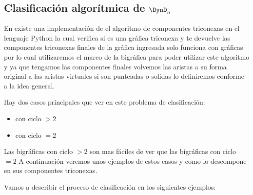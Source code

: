 \subsection{Clasificación algorítmica de $\DynD_{n}$}
En \citep{TricLinTimAlg} existe una implementación de el algoritmo de componentes triconexas en el lenguaje Python la cual verifica si es una gráfica triconexa y te devuelve las componentes triconexas finales de la gráfica ingresada solo funciona con gráficas por lo cual utilizaremos el marco de la bigráfica para poder utilizar este algoritmo y ya que tengamos las componentes finales volvemos las aristas a su forma original a las aristas virtuales si son punteadas o solidas lo definiremos conforme a la idea general.

Hay dos casos principales que ver en este problema de clasificación:
\begin{itemize}
 \item con ciclo $>2$
 \item con ciclo $=2$
\end{itemize}

Las bigráficas con ciclo $> 2$ son mas fáciles de ver que las bigráficas con ciclo $= 2$ A continuación veremos unos ejemplos de estos casos y como \citep{TricLinTimAlg} lo descompone en sus componentes triconexas.

Vamos a describir el proceso de clasificación en los siguientes ejemplos:

